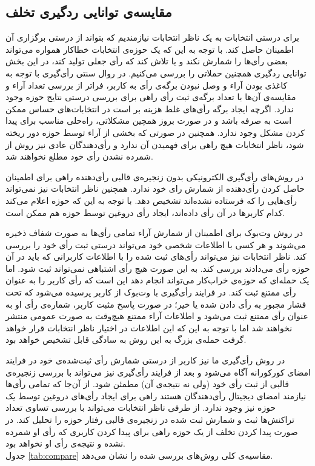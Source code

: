 \subsection{مقایسه‌ی توانایی ردگیری تخلف}
برای درستی انتخابات به یک ناظر انتخابات نیازمندیم که بتواند از درستی برگزاری آن اطمینان حاصل کند. با توجه به این که یک حوزه‌ی انتخابات خطاکار همواره می‌تواند بعضی رأی‌ها را شمارش نکند و یا تلاش کند که رأی جعلی تولید کند، در این بخش توانایی ردگیری همچنین حملاتی را بررسی می‌کنیم.
در روال سنتی رأی‌گیری با توجه به کاغذی بودن آراء و وصل نبودن برگه‌ی رأی به کاربر، فراتر از بررسی تعداد آراء و مقایسه‌ی آن‌ها با تعداد برگه‌ی ثبت رأی راهی برای بررسی درستی نتایج حوزه وجود ندارد. اگرچه ایجاد برگه‌ رأی‌های غلط هزینه بر است در انتخابات‌های حساس ممکن است به صرفه باشد و در صورت بروز همچین مشکلاتی، راه‌حلی مناسب برای پیدا کردن مشکل وجود ندارد. همچنین در صورتی که بخشی از آراء توسط حوزه دور ریخته شود، ناظر انتخابات هیچ راهی برای فهمیدن آن ندارد و رأی‌دهندگان عادی نیز روش از شمرده نشدن رأی خود مطلع نخواهند شد.
\par 
در روش‌های رأی‌گیری الکترونیکی بدون زنجیره‌ی قالبی  رأی‌دهنده راهی برای اطمینان حاصل کردن رأی‌‌دهنده از شمارش رای خود ندارد. همچنین ناظر انتخابات نیز نمی‌تواند رأی‌هایی را که فرستاده نشده‌اند تشخیص دهد. با توجه به این که حوزه اعلام می‌کند کدام کاربرها در آن رأی داده‌اند، ایجاد رأی دروغین توسط حوزه هم ممکن است. 
\par 
در روش‌ وت‌بوک برای اطمینان از شمارش آراء تمامی رأی‌ها به صورت شفاف ذخیره می‌شوند و هر کسی با اطلاعات شخصی خود می‌تواند درستی ثبت رأی خود را بررسی کند. ناظر انتخابات نیز می‌تواند رأی‌های ثبت شده را با اطلاعات کاربرانی که باید در آن حوزه رأی می‌دادند بررسی کند. به این صورت هیچ رأی اشتباهی نمی‌تواند ثبت شود. اما یک حمله‌ای که حوزه‌ی خراب‌کار می‌تواند انجام دهد این است که رأی کاربر را به عنوان رأی ممتنع ثبت کند. در فرایند رأی‌گیری با وت‌بوک از کاربر پرسیده می‌شود که تحت فشار مجبور به رأی دادن شده یا خیر؛ در صورت پاسخ مثبت کاربر، شماره‌ی رأی او به عنوان رأی ممتنع ثبت می‌شود و اطلاعات آراء ممتنع هیچ‌وقت به صورت عمومی منتشر نخواهند شد اما با توجه به این که این اطلاعات در اختیار ناظر انتخابات قرار خواهد گرفت حمله‌‌ی بزرگ به این روش به سادگی قابل تشخیص خواهد بود. 
\par 
در روش رأی‌گیری ما نیز کاربر از درستی شمارش رأی‌ ثبت‌شده‌ی خود در فرایند امضای کورکورانه آگاه می‌شود و بعد از فرایند رأی‌گیری نیز می‌تواند با بررسی زنجیره‌ی قالبی از ثبت رأی‌ خود (ولی نه نتیجه‌ی آن) مطمئن شود. از آن‌جا که تمامی رأی‌ها نیازمند امضای دیجیتال رأی‌دهندگان هستند راهی برای ایجاد رأی‌های دروغین توسط یک حوزه نیز وجود ندارد. از طرفی ناظر انتخابات می‌تواند با بررسی تساوی تعداد تراکنش‌ها ثبت و شمارش ثبت شده در زنجیره‌ی قالبی رفتار حوزه را تحلیل کند. در صورت پیدا کردن تخلف از یک حوزه راهی برای پیدا کردن کاربری که رأی او شمرده نشده و نتیجه‌ی رأی او نخواهد بود.
\\
جدول \ref{tab:compare} مقاسیه‌ی کلی روش‌های بررسی شده را نشان می‌دهد.



